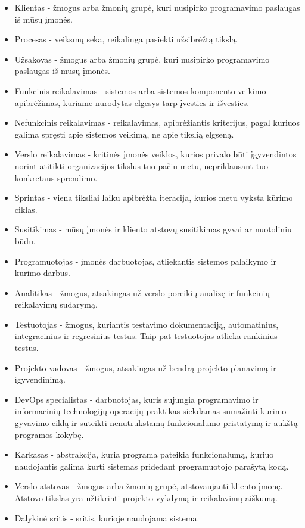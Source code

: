 \documentclass{VUMIFPSkursinis}
\begin{document}
	\begin{itemize}
		\item{Klientas - žmogus arba žmonių grupė, kuri nusipirko programavimo paslaugas iš mūsų įmonės.}
		\item{Procesas - veiksmų seka, reikalinga pasiekti užsibrėžtą tikslą.}
		\item{Užsakovas - žmogus arba žmonių grupė, kuri nusipirko programavimo paslaugas iš mūsų įmonės.}
		\item{Funkcinis reikalavimas - sistemos arba sistemos komponento veikimo apibrėžimas, kuriame nurodytas elgesys tarp įvesties ir išvesties.}
		\item{Nefunkcinis reikalavimas - reikalavimas, apibrėžiantis kriterijus, pagal kuriuos galima spręsti apie sistemos veikimą, ne apie tikslią elgseną.}
		\item{Verslo reikalavimas - kritinės įmonės veiklos, kurios privalo būti įgyvendintos norint atitikti organizacijos tikslus tuo pačiu metu, nepriklausant tuo konkretaus sprendimo.}
		\item{Sprintas - viena tiksliai laiku apibrėžta iteracija, kurios metu vyksta kūrimo ciklas.}
		\item{Susitikimas - mūsų įmonės ir kliento atstovų susitikimas gyvai ar nuotoliniu būdu.}
		\item{Programuotojas - įmonės darbuotojas, atliekantis sistemos palaikymo ir kūrimo darbus.}
		\item{Analitikas - žmogus, atsakingas už verslo poreikių analizę ir funkcinių reikalavimų sudarymą.}
		\item{Testuotojas - žmogus, kuriantis testavimo dokumentaciją, automatinius, integracinius ir regresinius testus. Taip pat testuotojas atlieka rankinius testus.}
		\item{Projekto vadovas - žmogus, atsakingas už bendrą projekto planavimą ir įgyvendinimą.}
		\item{DevOps specialistas - darbuotojas, kuris sujungia programavimo ir informacinių technologijų operacijų praktikas siekdamas sumažinti kūrimo gyvavimo ciklą ir suteikti nenutrūkstamą funkcionalumo pristatymą ir aukštą programos kokybę.}
		\item{Karkasas - abstrakcija, kuria programa pateikia funkcionalumą, kuriuo naudojantis galima kurti sistemas pridedant programuotojo parašytą kodą.}
		\item{Verslo atstovas - žmogus arba žmonių grupė, atstovaujanti kliento įmonę. Atstovo tikslas yra užtikrinti projekto vykdymą ir reikalavimų aiškumą.}
		\item{Dalykinė sritis - sritis, kurioje naudojama sistema.}
	\end{itemize}
\end{document}
